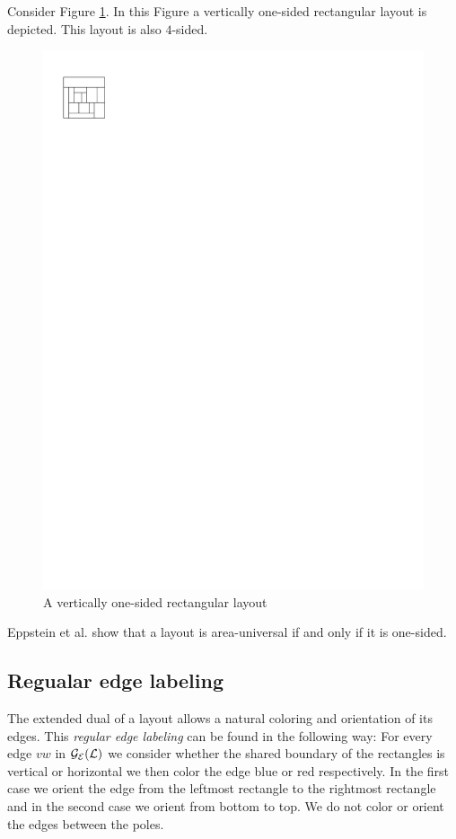   Consider  Figure \ref{fig:rect:vertonesided}. In this Figure a vertically one-sided rectangular layout is depicted. This layout is also $4$-sided.
  \begin{figure}[h]
    \centering
    \includegraphics[scale=1]{rectangularDuals/img/vertonesided}
    \caption{A vertically one-sided rectangular layout}
    \label{fig:rect:vertonesided}
  \end{figure}

  Eppstein et al. \cite{Eppstein2012} show that a layout is area-universal if and only if it is one-sided.

\subsection{Regualar edge labeling}
  The extended dual of a layout allows a natural coloring and orientation of its edges. This \emph{regular edge labeling} can be found in the following way:
  For every edge $vw$ in $\mathcal{G}_{\mathcal{E}}(\mathcal{L})$ we consider whether the shared boundary of the rectangles is vertical or horizontal we then color the edge blue or red respectively. In the first case we orient the edge from the leftmost rectangle to the rightmost rectangle and in the second case we orient from bottom to top. We do not color or orient the edges between the poles.

